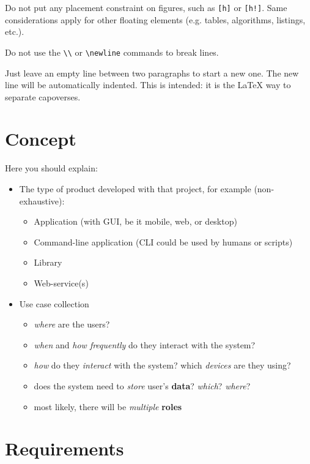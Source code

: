 \documentclass{scrartcl}
\begin{document}
Do not put any placement constraint on figures,
such as \texttt{[h]} or \texttt{[h!]}.
%
Same considerations apply for other floating elements 
(e.g. tables, algorithms, listings, etc.).

Do not use the \texttt{\textbackslash\textbackslash} or \texttt{\textbackslash newline} commands to break lines.

Just leave an empty line between two paragraphs to start a new one.
%
The new line will be automatically indented.
%
This is intended: it is the \LaTeX{} way to separate capoverses.

\section{Concept}\label{concept}

Here you should explain:

\begin{itemize}
  \item The type of product developed with that project, for example
  (non-exhaustive):

  \begin{itemize}
    \item Application (with GUI, be it mobile, web, or desktop)
    \item Command-line application (CLI could be used by humans or scripts)
    \item Library
    \item Web-service(s)
  \end{itemize}
  \item Use case collection

  \begin{itemize}
    \item \emph{where} are the users?
    \item \emph{when} and \emph{how frequently} do they interact with the
    system?
    \item \emph{how} do they \emph{interact} with the system? which
    \emph{devices} are they using?
    \item does the system need to \emph{store} user's \textbf{data}?
    \emph{which}? \emph{where}?
    \item most likely, there will be \emph{multiple} \textbf{roles}
  \end{itemize}
\end{itemize}

\section{Requirements}\label{requirements}
\end{document}
